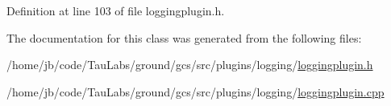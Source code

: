 \-Definition at line 103 of file loggingplugin.\-h.



\-The documentation for this class was generated from the following files\-:\begin{DoxyCompactItemize}
\item 
/home/jb/code/\-Tau\-Labs/ground/gcs/src/plugins/logging/\hyperlink{loggingplugin_8h}{loggingplugin.\-h}\item 
/home/jb/code/\-Tau\-Labs/ground/gcs/src/plugins/logging/\hyperlink{loggingplugin_8cpp}{loggingplugin.\-cpp}\end{DoxyCompactItemize}
